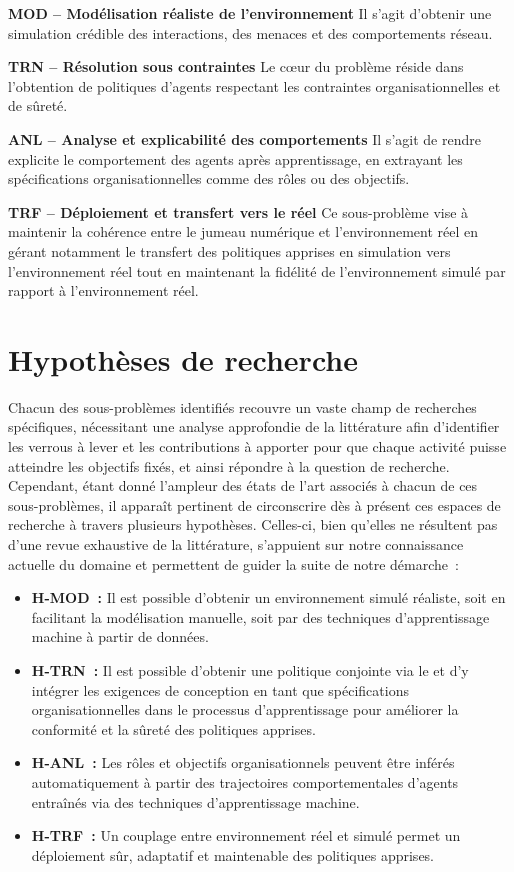 \medskip
\noindent
\textbf{\textbf{MOD} -- Modélisation réaliste de l'environnement}
Il s'agit d'obtenir une simulation crédible des interactions, des menaces et des comportements réseau.

\medskip
\noindent
\textbf{\textbf{TRN} -- Résolution sous contraintes}
Le cœur du problème réside dans l'obtention de politiques d'agents respectant les contraintes organisationnelles et de sûreté.

\medskip
\noindent
\textbf{\textbf{ANL} -- Analyse et explicabilité des comportements}
Il s'agit de rendre explicite le comportement des agents après apprentissage, en extrayant les spécifications organisationnelles comme des rôles ou des objectifs.

\medskip
\noindent
\textbf{\textbf{TRF} -- Déploiement et transfert vers le réel}
Ce sous-problème vise à maintenir la cohérence entre le jumeau numérique et l'environnement réel en gérant notamment le transfert des politiques apprises en simulation vers l'environnement réel tout en maintenant la fidélité de l'environnement simulé par rapport à l'environnement réel.

\section{Hypothèses de recherche}

Chacun des sous-problèmes identifiés recouvre un vaste champ de recherches spécifiques, nécessitant une analyse approfondie de la littérature afin d'identifier les verrous à lever et les contributions à apporter pour que chaque activité puisse atteindre les objectifs fixés, et ainsi répondre à la question de recherche. Cependant, étant donné l'ampleur des états de l'art associés à chacun de ces sous-problèmes, il apparaît pertinent de circonscrire dès à présent ces espaces de recherche à travers plusieurs hypothèses. Celles-ci, bien qu'elles ne résultent pas d'une revue exhaustive de la littérature, s'appuient sur notre connaissance actuelle du domaine et permettent de guider la suite de notre démarche~:

\begin{itemize}
  \item \textbf{\textbf{H-MOD}~:} Il est possible d'obtenir un environnement simulé réaliste, soit en facilitant la modélisation manuelle, soit par des techniques d'apprentissage machine à partir de données.
  \item \textbf{\textbf{H-TRN}~:} Il est possible d'obtenir une politique conjointe via le  et d'y intégrer les exigences de conception en tant que spécifications organisationnelles dans le processus d'apprentissage pour améliorer la conformité et la sûreté des politiques apprises.
  \item \textbf{\textbf{H-ANL}~:} Les rôles et objectifs organisationnels peuvent être inférés automatiquement à partir des trajectoires comportementales d'agents entraînés via des techniques d'apprentissage machine.
  \item \textbf{\textbf{H-TRF}~:} Un couplage entre environnement réel et simulé permet un déploiement sûr, adaptatif et maintenable des politiques apprises.
\end{itemize}

